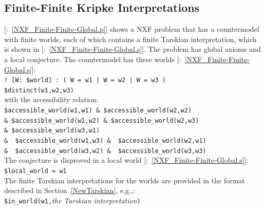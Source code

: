 \documentclass{ceurart}
\newcommand{\smalltt}[1]{\small \texttt{#1}}
\newcommand{\example}{{\scriptsize \faFile[regular]}}
\newcommand{\tildenot}{\raisebox{0.4ex}{\texttildelow}}
\begin{document}
\subsection{Finite-Finite Kripke Interpretations}
\label{NewKripkeFiniteFinite}

[\example{}:~\ref{NXF_Finite-Finite-Global.p}] shows a NXF problem 
that has a countermodel with finite worlds, each of which contains a finite Tarskian 
interpretation, which is shown in 
[\example{}:~\ref{NXF_Finite-Finite-Global.s}].
The problem has global axioms and a local conjecture.
The countermodel has three worlds [\example{}:~\ref{NXF_Finite-Finite-Global.s}]: \\
\hspace*{0.5cm}\smalltt{!\,[W:\,\$world]\,:\,(\,W\,=\,w1\,|\,W\,=\,w2\,|\,W\,=\,w3\,)} \\
\hspace*{0.5cm}\smalltt{\$distinct(w1,w2,w3)} \\
with the accessibility relation: \\
\hspace*{0.9cm}\smalltt{\$accessible\_world(w1,w1) \& \$accessible\_world(w2,w2)}\\
\hspace*{0.5cm}\smalltt{\& \$accessible\_world(w1,w2) \& \$accessible\_world(w2,w3)}\\
\hspace*{0.5cm}\smalltt{\& \$accessible\_world(w3,w1)}\\
\hspace*{0.5cm}\smalltt{\& \tildenot{}\,\$accessible\_world(w1,w3) \& \tildenot{}\,\$accessible\_world(w2,w1)}\\
\hspace*{0.5cm}\smalltt{\& \tildenot{}\,\$accessible\_world(w3,w2) \& \tildenot{}\,\$accessible\_world(w3,w3)}\\
The conjecture is disproved in a local world [\example{}:~\ref{NXF_Finite-Finite-Global.s}]: \\
\hspace*{0.5cm}\smalltt{\$local\_world = w1} \\
The finite Tarskian interpretations for the worlds are provided in the format described 
in Section~\ref{NewTarskian}, e.g.,: \\
\hspace*{0.5cm}\smalltt{\$in\_world(w1,}\emph{the Tarskian interpretation}\smalltt{)} \\
\end{document}
